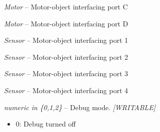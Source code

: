 \documentclass[letterpaper,10pt,english]{sphinxmanual}
\begin{document}
\begin{fulllineitems}

\begin{fulllineitems}
\label{source:source.EV3.motorC}
\emph{Motor} -- Motor-object interfacing port C

\end{fulllineitems}


\begin{fulllineitems}
\label{source:source.EV3.motorD}
\emph{Motor} -- Motor-object interfacing port D

\end{fulllineitems}


\begin{fulllineitems}
\label{source:source.EV3.sensor1}
\emph{Sensor} -- Motor-object interfacing port 1

\end{fulllineitems}


\begin{fulllineitems}
\label{source:source.EV3.sensor2}
\emph{Sensor} -- Motor-object interfacing port 2

\end{fulllineitems}


\begin{fulllineitems}
\label{source:source.EV3.sensor3}
\emph{Sensor} -- Motor-object interfacing port 3

\end{fulllineitems}


\begin{fulllineitems}
\label{source:source.EV3.sensor4}
\emph{Sensor} -- Motor-object interfacing port 4

\end{fulllineitems}


\begin{fulllineitems}
\label{source:source.EV3.debug}
\emph{numeric in \{0,1,2\}} -- Debug mode. \emph{{[}WRITABLE{]}}
\begin{itemize}
\item {} 
0: Debug turned off


\end{itemize}
\end{fulllineitems}
\end{fulllineitems}
\end{document}
